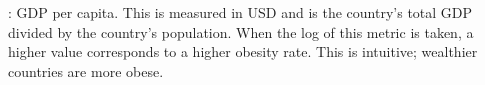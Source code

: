 \documentclass[oneside,12pt]{report}
\begin{document}
: GDP per capita. This is measured in USD and is the country's total GDP divided by the country's population. When the log of this metric is taken, a higher value corresponds to a higher obesity rate. This is intuitive; wealthier countries are more obese.
\vspace{5pt}





\renewcommand\bibname{Selected Bibliography Including Cited Works}
\nocite{*}  %

\end{document}
